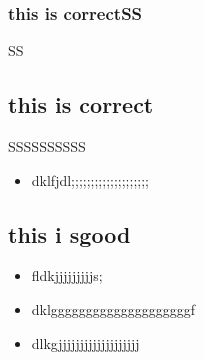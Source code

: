 \documentclass[10pt,b5paper]{article}
\begin{document}
\subsubsection{this is correctSS}
\label{sec-2-1-1}
SS

\subsection{this is correct}
\label{sec-2-2}
SSSSSSSSSS
\begin{itemize}
\item dklfjdl;;;;;;;;;;;;;;;;;;;;
\end{itemize}

\subsection{this i sgood}
\label{sec-2-3}
\begin{itemize}
\item fldkjjjjjjjjjs;
\item dklggggggggggggggggggggf
\item dlkgjjjjjjjjjjjjjjjjjjj
\end{itemize}
\end{document}
